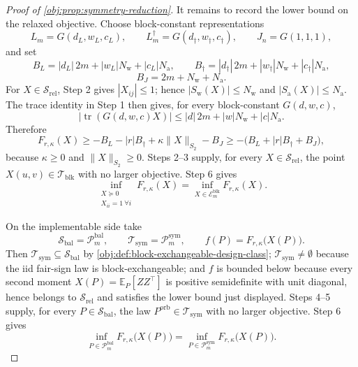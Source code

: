 \documentclass[11pt]{article}
\begin{document}
\begin{proof}[Proof of \cref{obj:prop:symmetry-reduction}]
It remains to record the lower bound on the relaxed objective.  Choose block-constant representations
\[
L_m=G(d_L,w_L,c_L),
\qquad
L_m^\dagger=G(d_\dagger,w_\dagger,c_\dagger),
\qquad
J_n=G(1,1,1),
\]
and set
\[
B_L=|d_L|\,2m+|w_L|N_{\mathrm{w}}+|c_L|N_{\mathrm{a}},
\qquad
B_\dagger=|d_\dagger|\,2m+|w_\dagger|N_{\mathrm{w}}+|c_\dagger|N_{\mathrm{a}},
\]
\[
B_J=2m+N_{\mathrm{w}}+N_{\mathrm{a}} .
\]
For \(X\in\mathcal S_{\mathrm{rel}}\), Step 2 gives \(|X_{ij}|\le1\); hence \(|S_{\mathrm{w}}(X)|\le N_{\mathrm{w}}\) and \(|S_{\mathrm{a}}(X)|\le N_{\mathrm{a}}\).  The trace identity in Step 1 then gives, for every block-constant \(G(d,w,c)\),
\[
\bigl|\operatorname{tr}(G(d,w,c)X)\bigr|
\le |d|\,2m+|w|N_{\mathrm{w}}+|c|N_{\mathrm{a}} .
\]
Therefore
\[
F_{r,\kappa}(X)
\ge -B_L-|r|B_\dagger+\kappa\|X\|_{S_2}-B_J
\ge -\bigl(B_L+|r|B_\dagger+B_J\bigr),
\]
because \(\kappa\ge0\) and \(\|X\|_{S_2}\ge0\). %
Steps 2--3 supply, for every \(X\in\mathcal S_{\mathrm{rel}}\), the point \(X(u,v)\in\mathcal T_{\mathrm{blk}}\) with no larger objective.  Step 6 gives
\[
\inf_{\substack{X\succeq0\\ X_{ii}=1\ \forall i}}F_{r,\kappa}(X)
=\inf_{X\in\mathcal E_m^{\mathrm{blk}}}F_{r,\kappa}(X).
\]

On the implementable side take
\[
\mathcal S_{\mathrm{bal}}=\mathcal P_m^{\mathrm{bal}},
\qquad
\mathcal T_{\mathrm{sym}}=\mathcal P_m^{\mathrm{sym}},
\qquad
f(P)=F_{r,\kappa}\bigl(X(P)\bigr).
\]
Then \(\mathcal T_{\mathrm{sym}}\subseteq\mathcal S_{\mathrm{bal}}\) by \cref{obj:def:block-exchangeable-design-class}; \(\mathcal T_{\mathrm{sym}}\ne\emptyset\) because the iid fair-sign law is block-exchangeable; %
and \(f\) is bounded below because every second moment \(X(P)=\mathbb E_P[ZZ^\top]\) is positive semidefinite with unit diagonal, hence belongs to \(\mathcal S_{\mathrm{rel}}\) and satisfies the lower bound just displayed. %
Steps 4--5 supply, for every \(P\in\mathcal S_{\mathrm{bal}}\), the law \(P^{\mathrm{orb}}\in\mathcal T_{\mathrm{sym}}\) with no larger objective.  Step 6 gives
\[
\inf_{P\in\mathcal P_m^{\mathrm{bal}}}F_{r,\kappa}\bigl(X(P)\bigr)
=\inf_{P\in\mathcal P_m^{\mathrm{sym}}}F_{r,\kappa}\bigl(X(P)\bigr).
\]
\end{proof}
\end{document}
